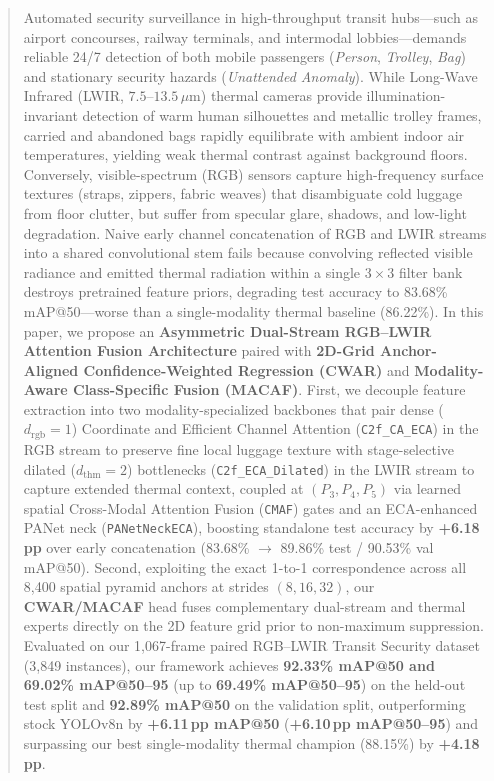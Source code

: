 \documentclass[journal,twoside,web]{ieeecolor}
\begin{document}
{{\begin{minipage}{\textwidth}
\begin{abstract}
Automated security surveillance in high-throughput transit hubs---such as airport concourses, railway terminals, and intermodal lobbies---demands reliable 24/7 detection of both mobile passengers (\textit{Person}, \textit{Trolley}, \textit{Bag}) and stationary security hazards (\textit{Unattended Anomaly}). While Long-Wave Infrared (LWIR, $7.5\text{--}13.5\,\mu\text{m}$) thermal cameras provide illumination-invariant detection of warm human silhouettes and metallic trolley frames, carried and abandoned bags rapidly equilibrate with ambient indoor air temperatures, yielding weak thermal contrast against background floors. Conversely, visible-spectrum (RGB) sensors capture high-frequency surface textures (straps, zippers, fabric weaves) that disambiguate cold luggage from floor clutter, but suffer from specular glare, shadows, and low-light degradation. Naive early channel concatenation of RGB and LWIR streams into a shared convolutional stem fails because convolving reflected visible radiance and emitted thermal radiation within a single $3\times 3$ filter bank destroys pretrained feature priors, degrading test accuracy to 83.68\% mAP@50---worse than a single-modality thermal baseline (86.22\%). In this paper, we propose an \textbf{Asymmetric Dual-Stream RGB--LWIR Attention Fusion Architecture} paired with \textbf{2D-Grid Anchor-Aligned Confidence-Weighted Regression (CWAR)} and \textbf{Modality-Aware Class-Specific Fusion (MACAF)}. First, we decouple feature extraction into two modality-specialized backbones that pair dense ($d_{\text{rgb}}=1$) Coordinate and Efficient Channel Attention (\texttt{C2f\_CA\_ECA}) in the RGB stream to preserve fine local luggage texture with stage-selective dilated ($d_{\text{thm}}=2$) bottlenecks (\texttt{C2f\_ECA\_Dilated}) in the LWIR stream to capture extended thermal context, coupled at $(P_3, P_4, P_5)$ via learned spatial Cross-Modal Attention Fusion (\texttt{CMAF}) gates and an ECA-enhanced PANet neck (\texttt{PANetNeckECA}), boosting standalone test accuracy by \textbf{+6.18\,pp} over early concatenation (83.68\% $\rightarrow$ 89.86\% test / 90.53\% val mAP@50). Second, exploiting the exact 1-to-1 correspondence across all 8,400 spatial pyramid anchors at strides $(8,16,32)$, our \textbf{CWAR/MACAF} head fuses complementary dual-stream and thermal experts directly on the 2D feature grid prior to non-maximum suppression. Evaluated on our 1,067-frame paired RGB--LWIR Transit Security dataset (3,849 instances), our framework achieves \textbf{92.33\% mAP@50 and 69.02\% mAP@50--95} (up to \textbf{69.49\% mAP@50--95}) on the held-out test split and \textbf{92.89\% mAP@50} on the validation split, outperforming stock YOLOv8n by \textbf{+6.11\,pp mAP@50} (\textbf{+6.10\,pp mAP@50--95}) and surpassing our best single-modality thermal champion (88.15\%) by \textbf{+4.18\,pp}.
\end{abstract}


\end{minipage}}}
\end{document}
